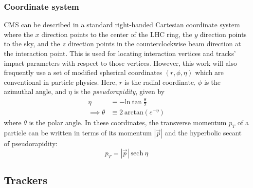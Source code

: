 \subsubsection{Coordinate system}
CMS can be described in a standard right-handed Cartesian coordinate system where 
the $x$ direction points to the center of the LHC ring, 
the $y$ direction points to the sky,
and the $z$ direction points in the counterclockwise beam direction at the interaction point.
This is used for locating interaction vertices and tracks' impact parameters with respect to those vertices.
However, this work will also frequently use a set of modified spherical coordinates $(r,\phi,\eta)$
which are conventional in particle physics.
Here, $r$ is the radial coordinate, $\phi$ is the azimuthal angle, and $\eta$ is the \textit{pseudorapidity}, given by
\begin{equation}
\begin{split}
\eta   & \equiv {-} \mathrm{ln}\:\mathrm{tan}\:\frac{\theta}{2} \\
\implies \theta & \equiv 2\:\mathrm{arctan} \left(e^{-\eta}\right)
\label{eq:eta}
\end{split}
\end{equation}
where $\theta$ is the polar angle. 
In these coordinates, the transverse momentum $p_T$ of a particle can be written in terms of its momentum $|\vec{p}|$ and the hyperbolic secant of pseudorapidity:
\begin{equation}
p_T = |\vec{p}|~\mathrm{sech}~\eta
\end{equation}

\subsection{Trackers}

